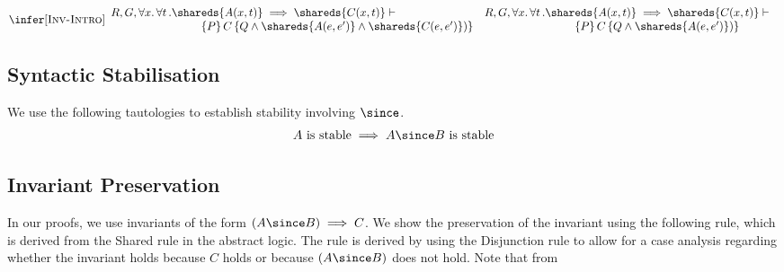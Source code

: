 {
\[
\infer[\textsc{Inv-Intro}]{
\begin{array}{l}
R, G, \forall x.\,\forall t\,. \shareds{A(x,t)}\implies \shareds{C(x,t)}\vdash \mbox{}\\
\qquad\qquad\qquad\qquad\{P \}\, 
C \, 
\{Q \wedge  \shareds{A(e,e')} \wedge  \shareds{C(e,e')}) \} %
\end{array}
}{
\begin{array}{l}
R, G, \forall x.\,\forall t\,. \shareds{A(x,t)}\implies \shareds{C(x,t)}\vdash \mbox{}\\
\qquad\qquad\qquad\qquad\{P \}\, 
C \, 
\{Q \wedge  \shareds{A(e,e')}) \} %
\end{array}
}
\]




\subsection{Syntactic Stabilisation}
We use the following tautologies to establish stability involving $\since$.
\[
\begin{array}{l}
  A~\text{is stable} \implies A \since B ~\text{is stable}
\end{array}
\]



\subsection{Invariant Preservation}
In our proofs, we use invariants of the form $(A \since B) \implies C$.
We show the preservation of the invariant using the following rule, 
which is derived from the  {\sc Shared} rule in the abstract logic.
The rule is derived by using the {\sc Disjunction} rule to allow for a 
case analysis regarding whether the invariant holds because  $C$ holds
or because $(A \since B)$ does not hold.
Note that from 

}
